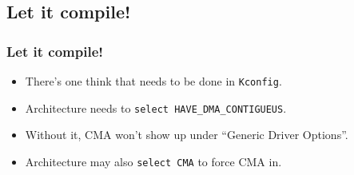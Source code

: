 \subsection{Let it compile!}

\begin{frame}
  \frametitle{Let it compile!}

  \begin{itemize}
  \item There's one think that needs to be done in \lstinline|Kconfig|.
  \item Architecture needs to \lstinline|select HAVE_DMA_CONTIGUEUS|.
  \item Without it, CMA won't show up under “Generic Driver Options”.
  \item Architecture may also \lstinline|select CMA| to force CMA in.
  \end{itemize}
\end{frame}
